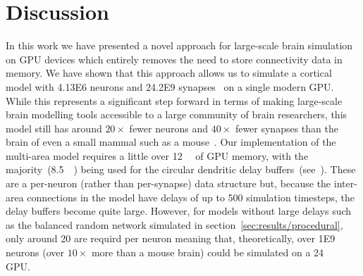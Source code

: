 \documentclass[9pt,a4paper]{amsart}
\begin{document}
\section{Discussion}
In this work we have presented a novel approach for large-scale brain simulation on GPU devices which entirely removes the need to store connectivity data in memory.
We have shown that this approach allows us to simulate a cortical model with \num{4.13E6} neurons and \num{24.2E9} synapses~\citep{Schmidt2018a,Schmidt2018} on a single modern GPU.
While this represents a significant step forward in terms of making large-scale brain modelling tools accessible to a large community of brain researchers, this model still has around $20\times$ fewer neurons and $40\times$ fewer synapses than the brain of even a small mammal such as a mouse~\citep{Herculano-Houzel2010}.
Our implementation of the multi-area model requires a little over \SI{12}{\giga\byte} of GPU memory, with the majority~(\SI{8.5}{\giga\byte}) being used for the circular dendritic delay buffers~(see~\citet{Knight2018}).
These are a per-neuron (rather than per-synapse) data structure but, because the inter-area connections in the model have delays of up to 500 simulation timesteps, the delay buffers become quite large.
However, for models without large delays such as the balanced random network simulated in section~\ref{sec:results/procedural}, only around \SI{20}{\byte} are requird per neuron meaning that, theoretically, over \num{1E9} neurons (over $10\times$ more than a mouse brain) could be simulated on a \SI{24}{\giga\byte} GPU.
\end{document}
